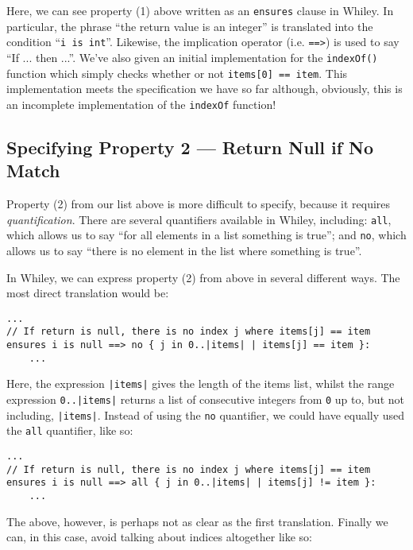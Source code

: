 

Here, we can see property (1) above written as an \lstinline{ensures}
clause in Whiley.  In particular, the phrase ``the return value is an
integer'' is translated into the condition ``\lstinline{i is int}''.
Likewise, the implication operator (i.e. \lstinline{==>}) is used to
say ``If ... then ...''.  We've also given an initial implementation
for the \lstinline{indexOf()} function which simply checks whether or
not \lstinline{items[0] == item}.  This implementation meets the
specification we have so far although, obviously, this is an
incomplete implementation of the \lstinline{indexOf} function!

\subsection{Specifying Property 2 --- Return Null if No Match}
Property (2) from our list above is more difficult to specify, because
it requires {\em quantification}.  There are several quantifiers
available in Whiley, including: \lstinline{all}, which allows us to
say ``for all elements in a list something is true''; and
\lstinline{no}, which allows us to say ``there is no element in the list
where something is true''. 

In Whiley, we can express property (2) from above in several different
ways.  The most direct translation would be:

\begin{lstlisting}
...
// If return is null, there is no index j where items[j] == item
ensures i is null ==> no { j in 0..|items| | items[j] == item }:
    ...
\end{lstlisting}

\noindent Here, the expression \lstinline{|items|} gives the length of
the items list, whilst the range expression \lstinline{0..|items|}
returns a list of consecutive integers from \lstinline{0} up to, but
not including, \lstinline{|items|}.  Instead of using the
\lstinline{no} quantifier, we could have equally used the
\lstinline{all} quantifier, like so:

\begin{lstlisting}
...
// If return is null, there is no index j where items[j] == item
ensures i is null ==> all { j in 0..|items| | items[j] != item }:
    ...
\end{lstlisting}

The above, however, is perhaps not as clear as the first translation.
Finally we can, in this case, avoid talking about indices altogether
like so:

